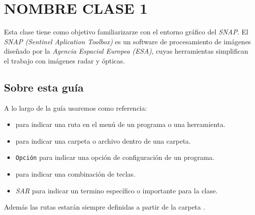 \chapter{NOMBRE CLASE 1}

Esta clase tiene como objetivo familiarizarze con el entorno gráfico del \emph{SNAP}. El \emph{SNAP (Sentinel Aplication Toolbox)} es un  software de procesamiento de imágenes diseñado por la \emph{Agencia Espacial Europea (ESA)}, cuyas herramientas simplifican el trabajo con imágenes radar y ópticas.



\section{Sobre esta guía}

A lo largo de la guía usaremos como referencia:

\begin{itemize}
  \item {} para indicar una ruta en el menú de un programa o una herramienta.
  \item {} para indicar una carpeta o archivo dentro de una carpeta.
  \item \texttt{Opción} para indicar una opción de configuración de un programa.
  \item {} para indicar una combinación de teclas.
  \item \emph{SAR} para indicar un termino específico o importante para la clase.
\end{itemize}

Además las rutas estarán siempre definidas a partir de la carpeta .
